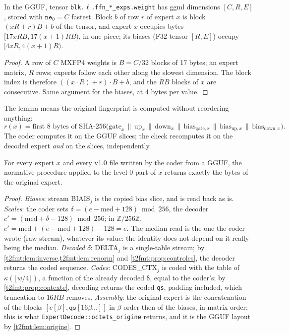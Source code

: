 \begin{lemme}\label{t2fmt:lem:origine}
In the GGUF, tensor \texttt{blk.$\ell$.ffn\_*\_exps\allowbreak.weight} has ggml dimensions $[C, R, E]$, stored with $\texttt{ne}_0 = C$ fastest. Block $b$ of row $r$ of expert $x$ is block $(xR + r)B + b$ of the tensor, and expert $x$ occupies bytes $[17xRB, 17(x+1)RB)$, in one piece; its biases (F32 tensor $[R, E]$) occupy $[4xR, 4(x+1)R)$.
\end{lemme}
\begin{proof}
A row of $C$ MXFP4 weights is $B = C/32$ blocks of 17 bytes; an expert matrix, $R$ rows; experts follow each other along the slowest dimension. The block index is therefore $((x \cdot R) + r) \cdot B + b$, and the $RB$ blocks of $x$ are consecutive. Same argument for the biases, at 4 bytes per value.
\end{proof}

The lemma means the original fingerprint is computed without reordering anything:
\[
r(x) = \text{first 8 bytes of } \text{SHA-256}\bigl(\text{gate}_x \,\|\, \text{up}_x \,\|\, \text{down}_x \,\|\, \text{bias}_{\text{gate},x} \,\|\, \text{bias}_{\text{up},x} \,\|\, \text{bias}_{\text{down},x}\bigr).
\]
The coder computes it on the GGUF slices; the check recomputes it on the decoded expert \emph{and} on the slices, independently.

\begin{theoreme}\label{t2fmt:thm:reconstruction}
For every expert $x$ and every v1.0 file written by the coder from a GGUF, the normative procedure applied to the level-0 part of $x$ returns exactly the bytes of the original expert.
\end{theoreme}
\begin{proof}
\emph{Biases}: stream BIAIS$_j$ is the copied bias slice, and is read back as is. \emph{Scales}: the coder sets $\delta = (e - \text{med} + 128) \bmod 256$, the decoder $e' = (\text{med} + \delta - 128) \bmod 256$; in $\mathbb{Z}/256\mathbb{Z}$, $e' = \text{med} + (e - \text{med} + 128) - 128 = e$. The median read is the one the coder wrote (raw stream), whatever its value: the identity does not depend on it really being the median. \emph{Decoded δ}: DELTA$_j$ is a single-table stream; by \cref{t2fmt:lem:inverse,t2fmt:lem:renorm} and \cref{t2fmt:prop:controles}, the decoder returns the coded sequence. \emph{Codes}: CODES\_CTX$_j$ is coded with the table of $\kappa(\lfloor w/4 \rfloor)$, a function of the already decoded δ, equal to the coder's; by \cref{t2fmt:prop:contexte}, decoding returns the coded \texttt{qs}, padding included, which truncation to $16RB$ removes. \emph{Assembly}: the original expert is the concatenation of the blocks $[e[\beta], \texttt{qs}[16\beta\dots]]$ in $\beta$ order then of the biases, in matrix order; this is what \texttt{ExpertDecode::octets\_origine} returns, and it is the GGUF layout by \cref{t2fmt:lem:origine}.
\end{proof}

